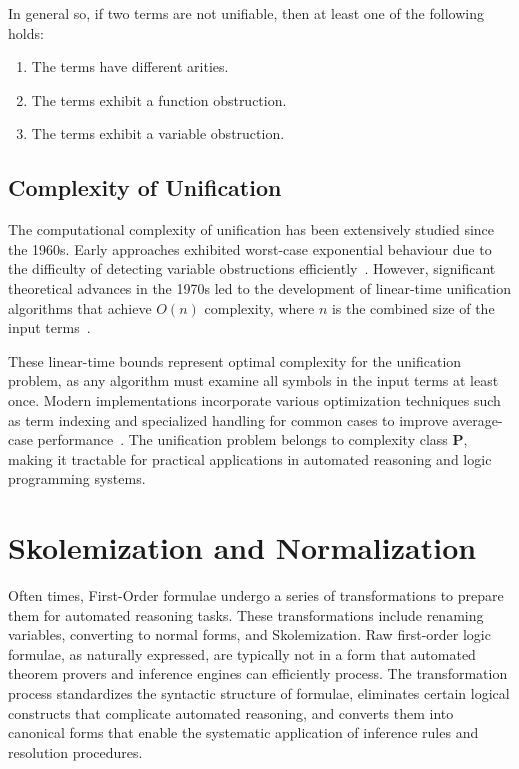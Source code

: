 In general so, if two terms are not unifiable, then at least one of the following holds:
\begin{enumerate}
    \item The terms have different arities.
    \item The terms exhibit a function obstruction.
    \item The terms exhibit a variable obstruction.
\end{enumerate}


\subsection{Complexity of Unification}
The computational complexity of unification has been extensively studied since the 1960s.
Early approaches exhibited worst-case exponential behaviour due to the difficulty of detecting variable obstructions efficiently~\cite{robinson1965}.
However, significant theoretical advances in the 1970s led to the development of linear-time unification algorithms that achieve \(O(n)\) complexity, where \(n\) is the combined size of the input terms~\cite{martelli1976, paterson1978}.

These linear-time bounds represent optimal complexity for the unification problem, as any algorithm must examine all symbols in the input terms at least once.
Modern implementations incorporate various optimization techniques such as term indexing and specialized handling for common cases to improve average-case performance~\cite{baader2001}.
The unification problem belongs to complexity class \textbf{P}, making it tractable for practical applications in automated reasoning and logic programming systems.


\section{Skolemization and Normalization}

Often times, First-Order formulae undergo a series of transformations to prepare them for automated reasoning tasks.
These transformations include renaming variables, converting to normal forms, and Skolemization.
Raw first-order logic formulae, as naturally expressed, are typically not in a form that automated theorem provers and inference engines can efficiently process.
The transformation process standardizes the syntactic structure of formulae, eliminates certain logical constructs that complicate automated reasoning, and converts them into canonical forms that enable the systematic application of inference rules and resolution procedures.

